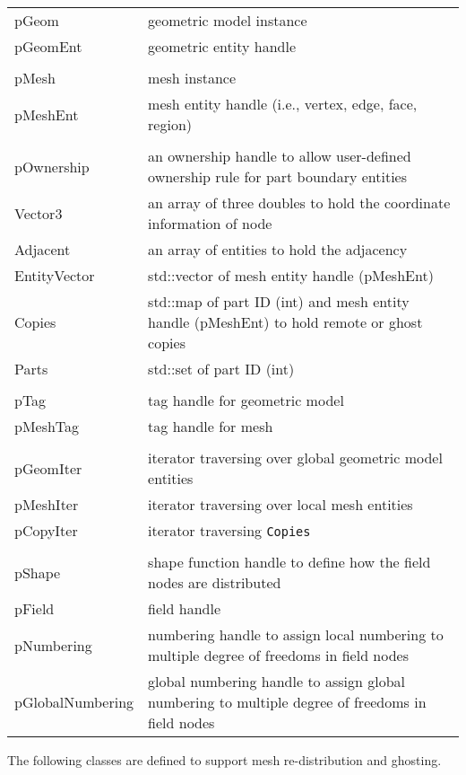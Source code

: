 \begin{tabular}{lp{14cm}}	
	pGeom &		geometric model instance \\
	pGeomEnt &	geometric entity handle \\
	&\\
	pMesh &		mesh instance\\
        pMeshEnt &	mesh entity handle (i.e., vertex, edge, face, region) \\
        &\\
        pOwnership &    an ownership handle to allow user-defined ownership rule for part boundary entities\\
        Vector3 & 	an array of three doubles to hold the coordinate information of node\\
        Adjacent & 	an array of entities to hold the adjacency\\
        EntityVector  &    std::vector of mesh entity handle (pMeshEnt) \\
        Copies &          std::map of part ID (int) and mesh entity handle (pMeshEnt) to hold remote or ghost copies \\
        Parts  &          std::set of part ID (int) \\
	&\\
        pTag &          tag handle for geometric model\\
        pMeshTag &      tag handle for mesh\\
        &\\
	pGeomIter &		iterator traversing over global geometric model entities \\
        pMeshIter &          iterator traversing over local mesh entities\\
        pCopyIter &       iterator traversing \texttt{Copies} \\
        &\\
	pShape &	     shape function handle to define how the field nodes are distributed \\
        pField &             field handle\\
        pNumbering & numbering handle to assign local numbering to multiple degree of freedoms in field nodes \\
        pGlobalNumbering &   global numbering handle to assign global numbering to multiple degree of freedoms in field nodes\\
\end{tabular}	

The following classes are defined to support mesh re-distribution and ghosting.

